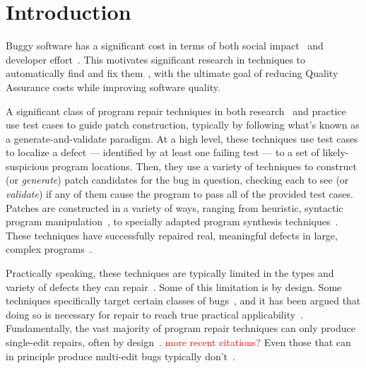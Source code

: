 \documentclass[sigconf, timestamp-false, anonymous=true]{acmart}
\newcommand\todo[1]{\textcolor{red}{#1}}
\begin{document}

\maketitle


\newcommand{\rqorinsight}[2]{
  \setlength{\fboxsep}{0.8em}
  \vspace{0.5em}
  \begin{center}
  \Ovalbox{\begin{minipage}{0.9\linewidth}
    \textbf{Research Question:} #1
    \end{minipage}}
  \end{center}
  \vspace{0.5em}}

\section{Introduction}

Buggy software has a significant cost in terms of both social impact~\cite{tricentis} 
and developer effort~\cite{cambridge-study}. This
motivates significant research in techniques to automatically find and fix
them~\cite{whatever}, with the ultimate goal of reducing Quality Assurance costs
while improving software quality. 

A significant class of program repair techniques in both
research~\cite{genprog,angelix,Le17, Xuan17} and practice~\cite{sapfix} use test cases to guide
patch construction, typically by following what's known as a
generate-and-validate paradigm. At a high level, these techniques use test cases
to localize a defect --- identified by at least one failing test --- to a set of
likely-suspicious program locations. Then, they use a variety of techniques to
construct (or \emph{generate}) patch candidates for the bug in question,
checking each to see (or \emph{validate}) if any of them cause the program to
pass all of the provided test cases.  
%
Patches are constructed in a variety of ways, ranging from heuristic, syntactic
program manipulation~\cite{syntax,examples}, to specially adapted program
synthesis techniques~\cite{examples}. These techniques have successfully
repaired real, meaningful defects in large, complex programs~\cite{examples}.

Practically speaking, these techniques are typically limited in the types and
variety of defects they can repair~\cite{for,example}. Some of this limitation
is by design. Some techniques specifically target certain classes of
bugs~\cite{nopol,sapfix}, and it has been argued that doing so is necessary for
repair to reach true practical applicability~\cite{maybe}. Fundamentally, the
vast majority of program repair techniques can only produce single-edit repairs,
often by design~\cite{rsrepair, ae, hdrepair}. \todo{more recent citations?}
Even those that can in principle produce multi-edit bugs typically
don't~\cite{poor,genprog}.
\end{document}
